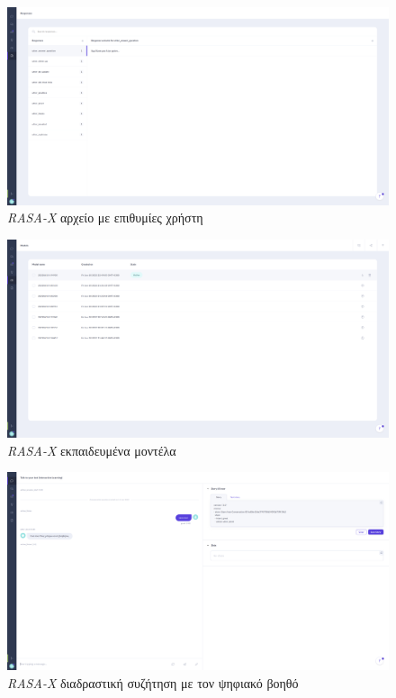 \begin{figure}[!ht]
  \centering
  \captionsetup{justification=centering}
  \includegraphics[width=1\textwidth]{images/appendix/rasax-responses.png}
  \caption{\emph{RASA-X} αρχείο με επιθυμίες χρήστη}
  \label{fig:rasax-responses}
\end{figure}
\noindent

\begin{figure}[!ht]
  \centering
  \captionsetup{justification=centering}
  \includegraphics[width=1\textwidth]{images/appendix/rasax-models.png}
  \caption{\emph{RASA-X} εκπαιδευμένα μοντέλα}
  \label{fig:rasax-models}
\end{figure}
\noindent

\begin{figure}[!ht]
  \centering
  \captionsetup{justification=centering}
  \includegraphics[width=1\textwidth]{images/appendix/rasax-conversation-interactive.png}
  \caption{\emph{RASA-X} διαδραστική συζήτηση με τον ψηφιακό βοηθό}
  \label{fig:rasax-conversation-interactive}
\end{figure}
\noindent

